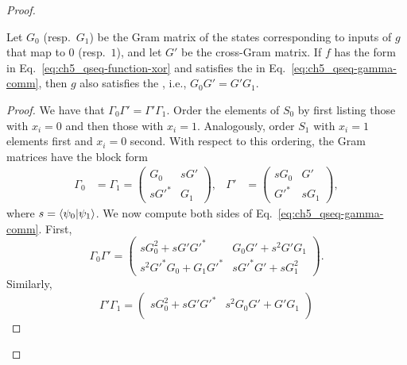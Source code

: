 \begin{proof}
    \begin{lemma}\label{lem:ch5_qseq-reduced-optimality}
        Let $G_0$ (resp.~$G_1$) be the Gram matrix of the states corresponding to inputs of $g$ that map to $0$ (resp.~$1$), and let $G'$ be the cross-Gram matrix.
        If $f$ has the form in Eq.~\eqref{eq:ch5_qseq-function-xor} and satisfies the \gammacomm{} in Eq.~\eqref{eq:ch5_qseq-gamma-comm}, then $g$ also satisfies the \gammacomm{}, i.e., $G_0 G' = G' G_1$.
    \end{lemma}

    \begin{proof}
        We have that $\Gamma_0 \Gamma' = \Gamma' \Gamma_1$.
        Order the elements of $S_0$ by first listing those with $x_i=0$ and then those with $x_i=1$.
        Analogously, order $S_1$ with $x_i=1$ elements first and $x_i=0$ second.
        With respect to this ordering, the Gram matrices have the block form
        \begin{align}
            \Gamma_0 &= \Gamma_1 =
            \begin{pmatrix}
                G_0 & s G' \\
                s G'^{*} & G_1
            \end{pmatrix},&
            \Gamma' &=
            \begin{pmatrix}
                s G_0 & G' \\
                G'^{*} & s G_1
            \end{pmatrix},
        \end{align}
        where $s=\braket{\psi_0}{\psi_1}$.
        We now compute both sides of Eq.~\eqref{eq:ch5_qseq-gamma-comm}.
        First,
        \begin{equation}
            \Gamma_0 \Gamma'
            =
            \begin{pmatrix}
                s G_0^2 + s G' G'^{*}
                &
                G_0 G' + s^2 G' G_1
                \\[4pt]
                s^2 G'^{*} G_0 + G_1 G'^{*}
                &
                s G'^{*} G' + s G_1^2
            \end{pmatrix}.
        \end{equation}
        Similarly,
        \begin{equation}
            \Gamma' \Gamma_1
            =
            \begin{pmatrix}
                s G_0^2 + s G' G'^{*}
                &
                s^2 G_0 G' + G' G_1
                \\[4pt]

\end{pmatrix}
\end{equation}
\end{proof}
\end{proof}
